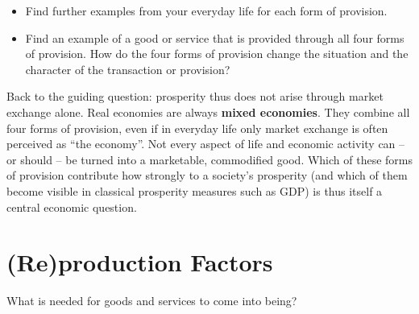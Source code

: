 \documentclass[
  british,
  a4paper,
  DIV=11,
  numbers=noendperiod,
  oneside,
  openany]{scrreprt}
\providecommand{\tightlist}{%
  \setlength{\itemsep}{0pt}\setlength{\parskip}{0pt}}
\begin{document}
\begin{tcolorbox}[enhanced jigsaw, arc=.35mm, bottomrule=.15mm, bottomtitle=1mm, breakable, colback=white, colbacktitle=quarto-callout-caution-color!10!white, colframe=quarto-callout-caution-color-frame, coltitle=black, left=2mm, leftrule=.75mm, opacityback=0, opacitybacktitle=0.6, rightrule=.15mm, title={In-depth questions}, titlerule=0mm, toprule=.15mm, toptitle=1mm]

\begin{itemize}
\tightlist
\item
  Find further examples from your everyday life for each form of
  provision.
\item
  Find an example of a good or service that is provided through all four
  forms of provision. How do the four forms of provision change the
  situation and the character of the transaction or provision?
\end{itemize}

\end{tcolorbox}

Back to the guiding question: prosperity thus does not arise through
market exchange alone. Real economies are always \textbf{mixed
economies}. They combine all four forms of provision, even if in
everyday life only market exchange is often perceived as ``the
economy''. Not every aspect of life and economic activity can -- or
should -- be turned into a marketable, commodified good. Which of these
forms of provision contribute how strongly to a society's prosperity
(and which of them become visible in classical prosperity measures such
as GDP) is thus itself a central economic question.

\section{(Re)production Factors}\label{reproduction-factors}

\begin{tcolorbox}[enhanced jigsaw, arc=.35mm, bottomrule=.15mm, bottomtitle=1mm, breakable, colback=white, colbacktitle=quarto-callout-note-color!10!white, colframe=quarto-callout-note-color-frame, coltitle=black, left=2mm, leftrule=.75mm, opacityback=0, opacitybacktitle=0.6, rightrule=.15mm, title={Guiding question}, titlerule=0mm, toprule=.15mm, toptitle=1mm]

What is needed for goods and services to come into being?

\end{tcolorbox}
\end{document}

